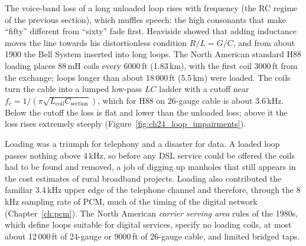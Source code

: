 The voice-band loss of a long unloaded loop rises with frequency (the RC regime of the previous
section), which muffles speech: the high consonants that make ``fifty'' different from ``sixty''
fade first. Heaviside showed that adding inductance moves the line towards his distortionless
condition $R/L=G/C$, and from about 1900 the Bell System inserted  into long
loops. The North American standard H88 loading places 88\,mH coils every 6000\,ft (1.83\,km), with
the first coil 3000\,ft from the exchange; loops longer than about 18\,000\,ft (5.5\,km) were
loaded. The coils turn the cable into a lumped low-pass $LC$ ladder with a cutoff near
$f_c=1/(\pi\sqrt{L_{\mathrm{coil}}C_{\mathrm{section}}})$, which for H88 on 26-gauge cable is about
3.6\,kHz. Below the cutoff the loss is flat and lower than the unloaded loss; above it the loss
rises extremely steeply (Figure~\ref{fig:ch24_loop_impairments}).



Loading was a triumph for telephony and a disaster for data. A loaded loop passes nothing above
4\,kHz, so before any DSL service could be offered the coils had to be found and removed, a job of
digging up manholes that still appears in the cost estimates of rural broadband projects. Loading
also contributed the familiar 3.4\,kHz upper edge of the telephone channel and therefore, through
the 8\,kHz sampling rate of PCM, much of the timing of the digital network (Chapter~\ref{ch:pcm}).
The North American \emph{carrier serving area} rules of the 1980s, which define loops suitable for
digital services, specify no loading coils, at most about 12\,000\,ft of 24-gauge or 9000\,ft of
26-gauge cable, and limited bridged taps.

